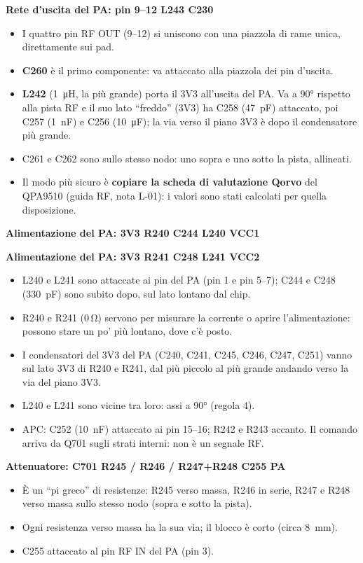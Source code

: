 \documentclass[a4paper,11pt]{article}
\newcommand{\blocco}[3]{%
  \par\medskip\noindent\begin{minipage}{\linewidth}
  {\sffamily\bfseries\color{sbblue}#1}\par\smallskip
  \centering\par\smallskip
  \raggedright\small #3
  \end{minipage}\par\medskip}
\begin{document}
\blocco{Rete d'uscita del PA: pin 9--12 \textrightarrow{} L243 \textrightarrow{} C230}{blk_uscita_pa}{%
\begin{itemize}[nosep]
\item I quattro pin RF OUT (9--12) si uniscono con una piazzola di rame unica, direttamente sui pad.
\item \textbf{C260} è il primo componente: va attaccato alla piazzola dei pin d'uscita.
\item \textbf{L242} (\SI{1}{\micro H}, la più grande) porta il 3V3 all'uscita del PA. Va a \ang{90} rispetto alla pista RF e il suo lato \enquote{freddo} (3V3) ha C258 (\SI{47}{pF}) attaccato, poi C257 (\SI{1}{nF}) e C256 (\SI{10}{\micro F}); la via verso il piano 3V3 è dopo il condensatore più grande.
\item C261 e C262 sono sullo stesso nodo: uno sopra e uno sotto la pista, allineati.
\item Il modo più sicuro è \textbf{copiare la scheda di valutazione Qorvo} del QPA9510 (guida RF, nota L-01): i valori sono stati calcolati per quella disposizione.
\end{itemize}}

\blocco{Alimentazione del PA: 3V3 \textrightarrow{} R240 \textrightarrow{} C244 \textrightarrow{} L240 \textrightarrow{} VCC1}{blk_alim_pa1}{}
\blocco{Alimentazione del PA: 3V3 \textrightarrow{} R241 \textrightarrow{} C248 \textrightarrow{} L241 \textrightarrow{} VCC2}{blk_alim_pa2}{%
\begin{itemize}[nosep]
\item L240 e L241 sono attaccate ai pin del PA (pin 1 e pin 5--7); C244 e C248 (\SI{330}{pF}) sono subito dopo, sul lato lontano dal chip.
\item R240 e R241 (0\,\si{\ohm}) servono per misurare la corrente o aprire l'alimentazione: possono stare un po' più lontano, dove c'è posto.
\item I condensatori del 3V3 del PA (C240, C241, C245, C246, C247, C251) vanno sul lato 3V3 di R240 e R241, dal più piccolo al più grande andando verso la via del piano 3V3.
\item L240 e L241 sono vicine tra loro: assi a \ang{90} (regola 4).
\item APC: C252 (\SI{10}{nF}) attaccato ai pin 15--16; R242 e R243 accanto. Il comando arriva da Q701 sugli strati interni: non è un segnale RF.
\end{itemize}}

\blocco{Attenuatore: C701 \textrightarrow{} R245 / R246 / R247+R248 \textrightarrow{} C255 \textrightarrow{} PA}{blk_attenuatore}{%
\begin{itemize}[nosep]
\item È un \enquote{pi greco} di resistenze: R245 verso massa, R246 in serie, R247 e R248 verso massa sullo stesso nodo (sopra e sotto la pista).
\item Ogni resistenza verso massa ha la sua via; il blocco è corto (circa \SI{8}{mm}).
\item C255 attaccato al pin RF IN del PA (pin 3).
\end{itemize}}
\end{document}
